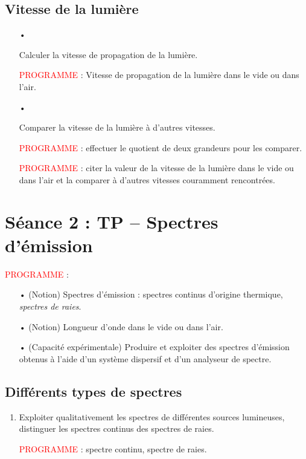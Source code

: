 \documentclass[12pt,a4paper,fleqn]{article}
\newcommand{\prog}{\textcolor{red}{PROGRAMME}}
\begin{document}
\subsection*{Vitesse de la lumière}

\begin{itemize}
\item[•] \app{} \rea{}

Calculer la vitesse de propagation de la lumière.

\prog{} : Vitesse de propagation de la lumière dans le vide ou dans l'air.

\item[•] \rea{}

Comparer la vitesse de la lumière à d'autres vitesses.

\prog{} : effectuer le quotient de deux grandeurs pour les comparer.

\prog{} : citer la valeur de la vitesse de la lumière dans le vide ou dans l'air et la comparer à d'autres vitesses couramment rencontrées.
\end{itemize}




\newpage
\section*{Séance 2 : TP -- Spectres d'émission}

\noindent
\prog{} :
\begin{itemize}
\item[•] (Notion) Spectres d'émission : spectres continus d'origine thermique, \textit{spectres de raies}.
\item[•] (Notion) Longueur d'onde dans le vide ou dans l'air.
\item[•] (Capacité expérimentale) Produire et exploiter des spectres d'émission obtenus à l'aide d'un système dispersif et d'un analyseur de spectre.
\end{itemize}

\subsection*{Différents types de spectres}

\begin{enumerate}
\item \app{} \anarai{}

Exploiter qualitativement les spectres de différentes sources lumineuses, distinguer les spectres continus des spectres de raies.

\prog{} : spectre continu, spectre de raies.

\end{enumerate}
\end{document}
